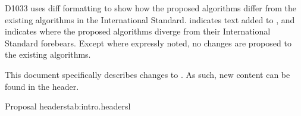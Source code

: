 \pnum
D1033 uses diff formatting to show how the proposed algorithms differ from the existing algorithms
in the International Standard.  indicates text added to
, and  indicates where the proposed algorithms diverge
from their International Standard forebears. Except where expressly noted, no changes are proposed
to the existing algorithms.

\pnum
This document specifically describes changes to . As such, new content can be found
in the  header.

\begin{floattable}{Proposal headers}{tab:intro.headers}{l}
\topline
{}\\
\bottomline
\end{floattable}
